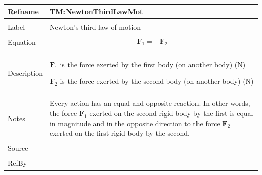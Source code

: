 \documentclass[12pt]{article}
\begin{document}
\noindent
\begin{minipage}{\textwidth}
\begin{tabular}{>{\raggedright}p{}>{\raggedright\arraybackslash}p{}}
\toprule \textbf{Refname} & \textbf{TM:NewtonThirdLawMot}
\label{TM:NewtonThirdLawMot}
\\ \midrule \\
Label & Newton's third law of motion
        
\\ \midrule \\
Equation & \begin{displaymath}
           {\mathbf{F}_{1}}=-{\mathbf{F}_{2}}
           \end{displaymath}
\\ \midrule \\
Description & \begin{symbDescription}
              \item{${\mathbf{F}_{1}}$ is the force exerted by the first body (on another body) (${\text{N}}$)}
              \item{${\mathbf{F}_{2}}$ is the force exerted by the second body (on another body) (${\text{N}}$)}
              \end{symbDescription}
\\ \midrule \\
Notes & Every action has an equal and opposite reaction. In other words, the force ${\mathbf{F}_{1}}$ exerted on the second rigid body by the first is equal in magnitude and in the opposite direction to the force ${\mathbf{F}_{2}}$ exerted on the first rigid body by the second.
        
\\ \midrule \\
Source & --
         
\\ \midrule \\
RefBy & 
\\ \bottomrule
\end{tabular}
\end{minipage}
\vspace{\baselineskip}
\noindent
\end{document}

